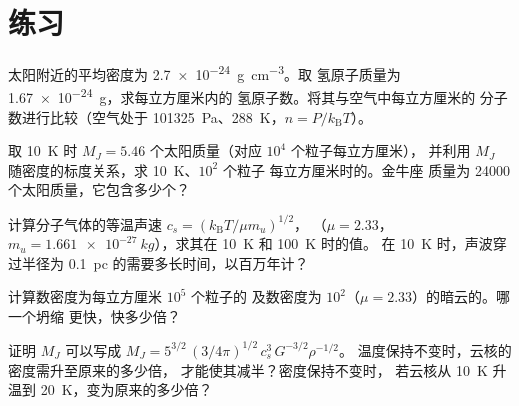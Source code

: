 \section{练习}

\begin{exercise}[$\star$]\label{exo:b2:ism-star-formation:1}
太阳附近的平均密度为 \qty{2.7e-24}{g.cm^{-3}}。取
氢原子质量为 \qty{1.67e-24}{g}，求每立方厘米内的
氢原子数。将其与空气中每立方厘米的
分子数进行比较（空气处于 \qty{101325}{Pa}、\qty{288}{K}，$n = P/k_{\mathrm B}T$）。
\end{exercise}

\begin{exercise}[$\star$]\label{exo:b2:ism-star-formation:2}
取 \qty{10}{K} 时 $M_J = 5.46$ 个太阳质量（对应 $10^4$ 个粒子每立方厘米），
并利用 $M_J$ 随密度的标度关系，求 \qty{10}{K}、$10^2$ 个粒子
每立方厘米时的。金牛座
质量为 \num{24000} 个太阳质量，它包含多少个？
\end{exercise}

\begin{exercise}[$\star$]\label{exo:b2:ism-star-formation:3}
计算分子气体的等温声速 $c_s = (k_{\mathrm B}T/\mu m_u)^{1/2}$，
（$\mu = 2.33$，$m_u = \qty{1.661e-27}{kg}$），求其在 \qty{10}{K} 和 \qty{100}{K} 时的值。
在 \qty{10}{K} 时，声波穿过半径为
\qty{0.1}{pc} 的需要多长时间，以百万年计？
\end{exercise}

\begin{exercise}[$\star$]\label{exo:b2:ism-star-formation:4}
计算数密度为每立方厘米 $10^5$ 个粒子的
及数密度为 $10^2$（$\mu = 2.33$）的暗云的。哪一个坍缩
更快，快多少倍？
\end{exercise}

\begin{exercise}[$\star\star$]\label{exo:b2:ism-star-formation:5}
证明 $M_J$ 可以写成 $M_J = 5^{3/2}\,(3/4\pi)^{1/2}\,c_s^3\,G^{-3/2}\rho^{-1/2}$。
温度保持不变时，云核的密度需升至原来的多少倍，
才能使其减半？密度保持不变时，
若云核从 \qty{10}{K} 升温到 \qty{20}{K}，变为原来的多少倍？
\end{exercise}

